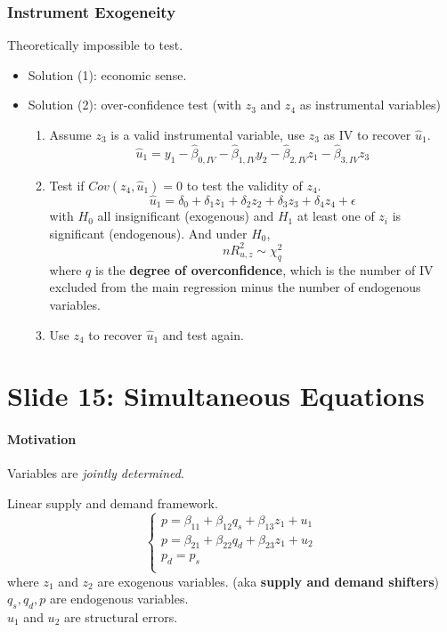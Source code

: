 \documentclass[]{article}
\begin{document}
		\subsubsection{Instrument Exogeneity}
			\par Theoretically impossible to test.
			\begin{itemize}
				\item Solution (1): economic sense.
				\item Solution (2): over-confidence test (with $z_3$ and $z_4$ as instrumental variables)
				\begin{enumerate}
					\item Assume $z_3$ is a valid instrumental variable, use $z_3$ as IV to recover $\hat{u}_1$. 
					\[
						\hat{u}_1 = y_1 - \hat{\beta}_{0, IV} - \hat{\beta}_{1, IV} y_2 - \hat{\beta}_{2, IV} z_1 - \hat{\beta}_{3, IV} z_3
					\]
					\item Test if $Cov(z_4, \hat{u}_1) = 0$ to test the validity of $z_4$.
					\[
						\hat{u}_1 = \delta_0 + \delta_1 z_1 + \delta_2 z_2 + \delta_3 z_3 + \delta_4 z_4 + \epsilon
					\]
					with $H_0$ all insignificant (exogenous) and $H_1$ at least one of $z_i$ is significant (endogenous). And under $H_0$,
					\[
						nR^2_{u,z} \sim \chi^2_q
					\]
					where $q$ is the \textbf{degree of overconfidence}, which is the number of IV excluded from the main regression minus the number of endogenous variables.
					\item Use $z_4$ to recover $\hat{u}_1$ and test again.
				\end{enumerate}
			\end{itemize}
	\section{Slide 15: Simultaneous Equations}
		\paragraph{Motivation} Variables are \emph{jointly determined}.
		\begin{example}
			Linear supply and demand framework.
			\[
				\begin{cases}
					p = \beta_{11} + \beta_{12} q_s + \beta_{13} z_1 + u_1 \\
					p = \beta_{21} + \beta_{22} q_d + \beta_{23} z_1 + u_2 \\
					p_d = p_s \\
				\end{cases}
			\]
			where $z_1$ and $z_2$ are exogenous variables. (aka \textbf{supply and demand shifters})\\
			$q_s, q_d, p$ are endogenous variables. \\
			$u_1$ and $u_2$ are structural errors.
		\end{example}
		
\end{document}
